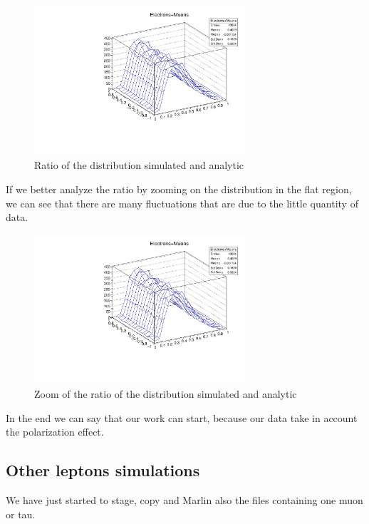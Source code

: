 \begin{figure} [ht!]
  \centering
  \includegraphics[width=0.7\textwidth]{02_Electrons+muons.pdf}
 \caption{Ratio of the distribution simulated and analytic}
 \label{02_Energy_angle_ratio}
\end{figure}

If we better analyze the ratio by zooming on the distribution in the flat region, we can see that there are many fluctuations that are due to the little quantity of data. 

\begin{figure} [ht!]
  \centering
  \includegraphics[width=0.7\textwidth]{02_Electrons+muons.pdf}
 \caption{Zoom of the ratio of the distribution simulated and analytic}
 \label{02_Energy_angle_ratio_zoom}
\end{figure}

In the end we can say that our work can start, because our data take in account the polarization effect.

\subsection{Other leptons simulations}

We have just started to stage, copy and Marlin also the files containing one muon or tau.